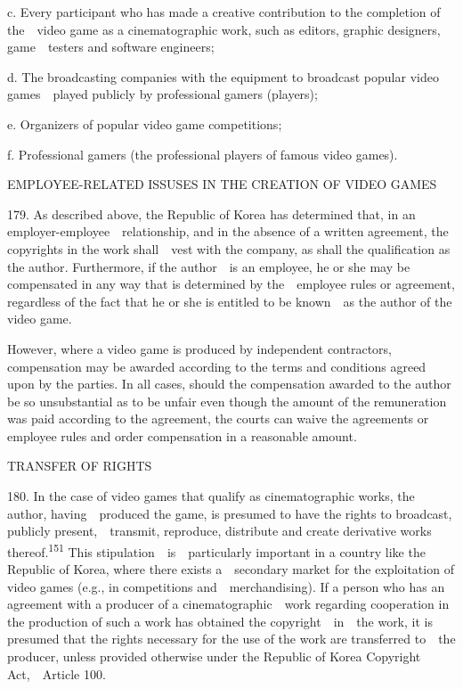 \documentclass[
]{article}
\begin{document}
{c. Every participant who has made a creative contribution to the
completion of the~~video game as a cinematographic work, such as
editors, graphic designers, game~~testers and software engineers;}

{d. The broadcasting companies with the equipment to broadcast popular
video games~~played publicly by professional gamers (players);}

{e. Organizers of popular video game competitions;}

{f. Professional gamers (the professional players of famous video
games).}

{EMPLOYEE-RELATED ISSUSES IN THE CREATION OF VIDEO GAMES}

{179. }{As described above, the Republic of Korea has determined that,
in an employer-employee~~relationship, and in the absence of a written
agreement, the copyrights in the work shall~~vest with the company, as
shall the qualification as the }{author}{. Furthermore, if the
author~~is an employee, he or she may be compensated in any way that is
determined by the~~employee rules or agreement, regardless of the fact
that he or she is entitled to be known~~as the author of the video
game.}

{However, where a video game is produced by independent contractors,
compensation may be awarded according to the terms and conditions agreed
upon by the parties. In all cases, should the compensation awarded to
the author be so unsubstantial as to be unfair even though the amount of
the remuneration was paid according to the agreement, the courts can
waive the agreements or employee rules and order compensation in a
reasonable amount.}

{TRANSFER OF RIGHTS}

{180. }{In the case of video games that qualify as cinematographic
works, the author, having~~produced the game, is presumed to have the
rights to broadcast, publicly present,~~transmit, reproduce, distribute
and create derivative works thereof.}\textsuperscript{{151 }}{This
stipulation~~is~~particularly important in a country like the Republic
of Korea, where there exists a~~secondary market for the exploitation of
video games (e.g., in competitions and~~merchandising). If a person who
has an agreement with a producer of a cinematographic~~work regarding
cooperation in the production of such a work has obtained the
copyright~~in~~the work, it is presumed that the rights necessary for
the use of the work are transferred to~~the producer, unless provided
otherwise under the Republic of Korea }{Copyright Act}{,~~Article 100.}
\end{document}
